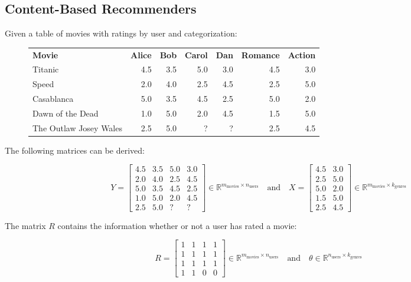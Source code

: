 \documentclass[a4paper,11pt]{scrartcl}
\begin{document}
\subsection{Content-Based Recommenders}

Given a table of movies with ratings by user and categorization:

\begin{figure}[H]
    \centering
    \begin{tabularx}{\linewidth}{l|r r r r|r r}
        \textbf{Movie} & \textbf{Alice} & \textbf{Bob} & \textbf{Carol} & \textbf{Dan} & \textbf{Romance} & \textbf{Action} \\
        \cline{1-7}
        Titanic & 4.5 & 3.5 & 5.0 & 3.0 & 4.5 & 3.0 \\
        Speed & 2.0 & 4.0 & 2.5 & 4.5 & 2.5 & 5.0 \\
        Casablanca & 5.0 & 3.5 & 4.5 & 2.5 & 5.0 & 2.0 \\
        Dawn of the Dead & 1.0 & 5.0 & 2.0 & 4.5 & 1.5 & 5.0 \\
        The Outlaw Josey Wales & 2.5 & 5.0 & ? & ? & 2.5 & 4.5 \\
    \end{tabularx}
\end{figure}

The following matrices can be derived:

$$ Y =
\begin{bmatrix}
    4.5 & 3.5 & 5.0 & 3.0 \\
    2.0 & 4.0 & 2.5 & 4.5 \\
    5.0 & 3.5 & 4.5 & 2.5 \\
    1.0 & 5.0 & 2.0 & 4.5 \\
    2.5 & 5.0 & ? & ? 
\end{bmatrix}
\in \mathbb{R}^{m_{\text{movies}} \times n_{\text{users}}}
\quad
\text{and}
\quad
X =
\begin{bmatrix}
    4.5 & 3.0 \\
    2.5 & 5.0 \\
    5.0 & 2.0 \\
    1.5 & 5.0 \\
    2.5 & 4.5
\end{bmatrix}
\in \mathbb{R}^{m_{\text{movies}} \times k_{\text{genres}}} $$

The matrix $R$ contains the information whether or not a user has rated a movie:

$$ R =
\begin{bmatrix}
    1 & 1 & 1 & 1 \\
    1 & 1 & 1 & 1 \\
    1 & 1 & 1 & 1 \\
    1 & 1 & 0 & 0
\end{bmatrix}
\in \mathbb{R}^{m_{\text{movies}} \times n_{\text{users}}}
\quad
\text{and}
\quad
\theta \in \mathbb{R}^{n_{\text{users}} \times k_{\text{genres}}} $$
\end{document}
